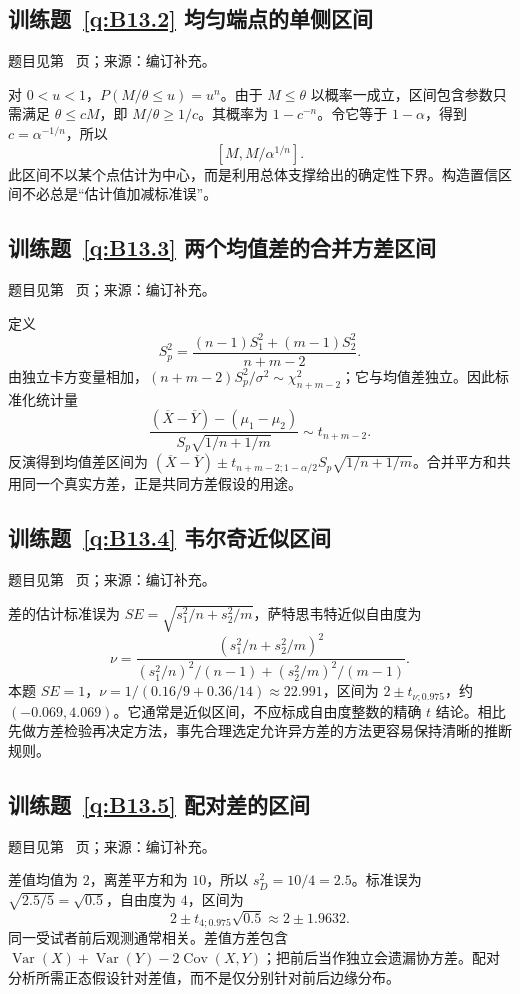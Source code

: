 \subsection*{训练题~\ref{q:B13.2} 均匀端点的单侧区间}\label{a:B13.2}{\small 题目见第~\pageref{q:B13.2} 页；来源：编订补充。}
\begin{solve}对 $0<u<1$，$P(M/\theta\le u)=u^n$。由于 $M\le\theta$ 以概率一成立，区间包含参数只需满足 $\theta\le cM$，即 $M/\theta\ge1/c$。其概率为 $1-c^{-n}$。令它等于 $1-\alpha$，得到 $c=\alpha^{-1/n}$，所以\[[M,M/\alpha^{1/n}].\]此区间不以某个点估计为中心，而是利用总体支撑给出的确定性下界。构造置信区间不必总是“估计值加减标准误”。\end{solve}

\subsection*{训练题~\ref{q:B13.3} 两个均值差的合并方差区间}\label{a:B13.3}{\small 题目见第~\pageref{q:B13.3} 页；来源：编订补充。}
\begin{solve}定义\[S_p^2=\frac{(n-1)S_1^2+(m-1)S_2^2}{n+m-2}.\]由独立卡方变量相加，$(n+m-2)S_p^2/\sigma^2\sim\chi^2_{n+m-2}$；它与均值差独立。因此标准化统计量\[\frac{(\overline X-\overline Y)-(\mu_1-\mu_2)}{S_p\sqrt{1/n+1/m}}\sim t_{n+m-2}.\]反演得到均值差区间为 $(\overline X-\overline Y)\pm t_{n+m-2;1-\alpha/2}S_p\sqrt{1/n+1/m}$。合并平方和共用同一个真实方差，正是共同方差假设的用途。\end{solve}

\subsection*{训练题~\ref{q:B13.4} 韦尔奇近似区间}\label{a:B13.4}{\small 题目见第~\pageref{q:B13.4} 页；来源：编订补充。}
\begin{solve}差的估计标准误为 $SE=\sqrt{s_1^2/n+s_2^2/m}$，萨特思韦特近似自由度为\[\nu=\frac{(s_1^2/n+s_2^2/m)^2}{(s_1^2/n)^2/(n-1)+(s_2^2/m)^2/(m-1)}.\]本题 $SE=1$，$\nu=1/(0.16/9+0.36/14)\approx22.991$，区间为 $2\pm t_{\nu;0.975}$，约 $(-0.069,4.069)$。它通常是近似区间，不应标成自由度整数的精确 $t$ 结论。相比先做方差检验再决定方法，事先合理选定允许异方差的方法更容易保持清晰的推断规则。\end{solve}

\subsection*{训练题~\ref{q:B13.5} 配对差的区间}\label{a:B13.5}{\small 题目见第~\pageref{q:B13.5} 页；来源：编订补充。}
\begin{solve}差值均值为 $2$，离差平方和为 $10$，所以 $s_D^2=10/4=2.5$。标准误为 $\sqrt{2.5/5}=\sqrt{0.5}$，自由度为 $4$，区间为\[2\pm t_{4;0.975}\sqrt{0.5}\approx2\pm1.9632.\]同一受试者前后观测通常相关。差值方差包含 $\operatorname{Var}(X)+\operatorname{Var}(Y)-2\operatorname{Cov}(X,Y)$；把前后当作独立会遗漏协方差。配对分析所需正态假设针对差值，而不是仅分别针对前后边缘分布。\end{solve}

